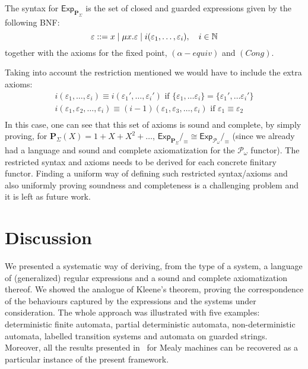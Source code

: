 \documentclass{LMCS}
\def\pow{{\mathcal P_{\!\!\!\omega}}}
\newcommand\E\varepsilon
\newcommand\Exp{\mathsf{Exp}}
\newcommand\Pol{\mathbf{P}}
\def\hyph{-\penalty0\hskip0pt\relax}
\theoremstyle{definition}
\theoremstyle{plain}
\theoremstyle{plain}
\theoremstyle{plain}
\theoremstyle{plain}
\theoremstyle{definition}
\theoremstyle{definition}
\begin{document}
The syntax for $\Exp_{\Pol_\Sigma}$ is the set of
closed and guarded expressions given by the following BNF:
\[
\E ::= x \mid \mu x.\E \mid i(\E_1,\ldots,\E_i), \ \ \ i\in \mathbb{N}\\
\]
together with the axioms for the fixed point,
$(\alpha-\mathit{equiv})$ and $\mathit{(Cong)}$. 

Taking into account the restriction mentioned we would have to include
the extra axioms:
\[
\begin{array}{l}
i(\E_1,\ldots,\E_i) \equiv i(\E_1',\ldots,\E_i') \text { if }
\{\E_1,\ldots \E_i\} =  \{\E_1',\ldots \E_i'\}\\
i(\E_1,\E_2,\ldots,\E_i) \equiv (i-1)(\E_1,\E_3,\ldots,\E_i) \text { if }
\E_1\equiv \E_2\\

\end{array}
\]
In this case, one can see that this set of axioms is sound and
complete, by simply proving, for $\Pol_\Sigma(X)
= 1+X+X^2+\ldots$, $\Exp_{\Pol_\Sigma}/_\equiv \cong \Exp_\pow/_\equiv$
(since we already had a language and sound and complete axiomatization
for the $\pow$ functor). The restricted syntax and axioms needs to 
be derived for each concrete finitary functor. 
Finding a uniform way of defining such restricted syntax/axioms and
also uniformly proving soundness and completeness is a challenging problem and it is left as future work. 

\section{Discussion}\label{sec:conclusions5}

We presented a systematic way of deriving, from the type of a system,
a language of (generalized) regular expressions and a sound and
complete axiomatization thereof. We showed the analogue of Kleene's
theorem, proving the correspondence of the behaviours captured by
the expressions and the systems under consideration. The whole
approach was illustrated with five examples: deterministic finite
automata, partial deterministic automata, non\hyph deterministic automata,
labelled transition systems and automata on guarded strings. Moreover,
all the results presented in~\cite{BRS08} for Mealy machines can be recovered as
a particular instance of the present framework. 
 
\end{document}
